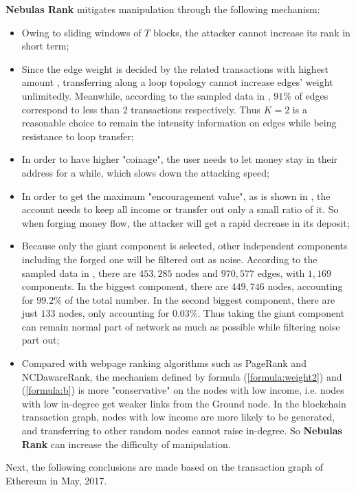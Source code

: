 \textbf{Nebulas Rank} mitigates manipulation through the following mechanism:
\begin{itemize}
	\item Owing to sliding windows of $T$ blocks, the attacker cannot increase its rank in short term;
	\item Since the edge weight is decided by the related transactions with highest amount , transferring along a loop topology cannot increase edges' weight unlimitedly. Meanwhile, according to the sampled data in , $91\%$ of edges correspond to less than 2 transactions respectively. Thus $K=2$ is a reasonable choice to remain the intensity information on edges while being resistance to loop transfer;
	\item In order to have higher "coinage", the user needs to let money stay in their address for a while, which slows down the attacking speed;
	\item In order to get the maximum "encouragement value", as is shown in , the account needs to keep all income or transfer out only a small ratio of it. So when forging money flow, the attacker will get a rapid decrease in its deposit;
	\item Because only the giant component is selected, other independent components including the forged one will be filtered out as noise. According to the sampled data in , there are $453,285$ nodes and $970,577$ edges, with $1,169$ components. In the biggest component, there are $449,746$ nodes, accounting for $99.2\%$ of the total number. In the second biggest component, there are just $133$ nodes, only accounting for $0.03\%$. Thus taking the giant component can remain normal part of network as much as possible while filtering noise part out;
	\item Compared with webpage ranking algorithms such as PageRank and NCDawareRank\cite{Nikolakopoulos2013}, the mechanism defined by formula (\ref{formula:weight2}) and (\ref{formula:b}) is more "conservative" on the nodes with low income, i.e. nodes with low in-degree get weaker links from the Ground node. In the blockchain transaction graph, nodes with low income are more likely to be generated, and transferring to other random nodes cannot raise in-degree. So \textbf{Nebulas Rank} can increase the difficulty of manipulation.
\end{itemize}

Next, the following conclusions are made based on the transaction graph of Ethereum in May, 2017.

